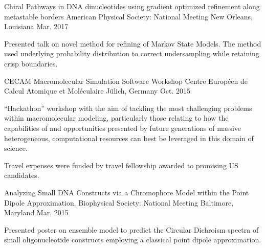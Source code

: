 
%
%

\begin{cventries}
  \cventry
    {Chiral Pathways in DNA dinucleotides using gradient optimized refinement along metastable borders} %
    {American Physical Society: National Meeting} %
    {New Orleans, Louisiana} %
    {Mar. 2017} %
    {
      \begin{cvitems} %
        \item{Presented talk on novel method for refining of Markov State Models. The method used underlying probability distribution to correct undersampling while retaining crisp boundaries.}
      \end{cvitems}
    }

  \cventry
    {CECAM Macromolecular Simulation Software Workshop}
    {Centre Europ{\'e}en de Calcul Atomique et Mol{\'e}culaire}
    {J{\"u}lich, Germany}
    {Oct. 2015}
    {
      \begin{cvitems}
        \item{“Hackathon” workshop with the aim of tackling the most challenging problems within macromolecular modeling, particularly those relating to how the capabilities of and opportunities presented by future generations of massive heterogeneous, computational resources can best be leveraged in this domain of science.}
        \item{Travel expenses were funded by travel fellowship awarded to promising US candidates.}
      \end{cvitems}
    }

  \cventry
    {Analyzing Small DNA Constructs via a Chromophore Model within the Point Dipole Approximation.} %
    {Biophysical Society: National Meeting} %
    {Baltimore, Maryland} %
    {Mar. 2015} %
    {
      \begin{cvitems} %
        \item{Presented poster on ensemble model to predict the Circular Dichroism spectra of small oligonucleotide constructs employing a classical point dipole approximation.}
      \end{cvitems}
    }


\end{cventries}
